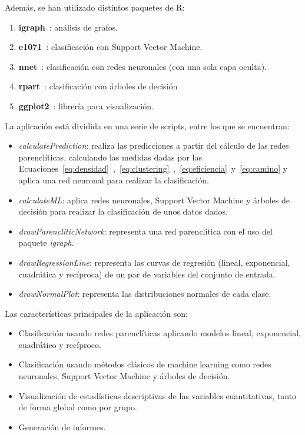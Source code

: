 Además, se han utilizado distintos paquetes de R:

\begin{enumerate}
	\item \textbf{igraph}~\cite{igraph}: análisis de grafos.
	\item \textbf{e1071}~\cite{e1071}: clasificación con Support Vector Machine.
	\item \textbf{nnet}~\cite{nnet}: clasificación con redes neuronales (con una sola capa oculta).
	\item \textbf{rpart}~\cite{rpart}: clasificación con árboles de decisión
	\item \textbf{ggplot2}~\cite{ggplot2}: librería para visualización. 
\end{enumerate}


La aplicación está dividida en una serie de scripts, entre los que se encuentran:

\begin{itemize}
	\item \textit{calculatePrediction}: realiza las predicciones a partir del cálculo de las redes parenclíticas, calculando las medidas dadas por las Ecuaciones~\ref{eq:densidad}~,~\ref{eq:clustering}~,~\ref{eq:eficiencia}~y~\ref{eq:camino} y aplica una red neuronal para realizar la clasificación.
	
	\item \textit{calculateML}: aplica redes neuronales, Support Vector Machine y árboles de decisión para realizar la clasificación de unos datos dados.
	
	\item \textit{drawParencliticNetwork}: representa una red parenclítica con el uso del paquete \textit{igraph}.
	
	\item \textit{drawRegressionLine}: representa las curvas de regresión (lineal, exponencial, cuadrática y recíproca) de un par de variables del conjunto de entrada.
	
	\item \textit{drawNormalPlot}: representa las distribuciones normales de cada clase. 
\end{itemize}

Las características principales de la aplicación son:

\begin{itemize}
	\item Clasificación usando redes parenclíticas aplicando modelos lineal, exponencial, cuadrático y recíproco.
	
	\item Clasificación usando métodos clásicos de machine learning como redes neuronales, Support Vector Machine y árboles de decisión.
	
	\item Visualización de estadísticas descriptivas de las variables cuantitativas, tanto de forma global como por grupo.
	
	\item Generación de informes.
\end{itemize}


